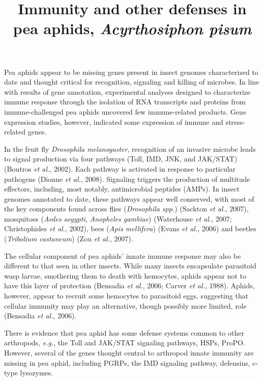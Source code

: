 \documentclass[11pt]{article}
\title{Immunity and other defenses in pea aphids, \textit{Acyrthosiphon pisum}}
\author{}
\date{}
\begin{document}
  \maketitle

  \linenumbers
Pea aphids appear to be missing genes present in insect genomes characterized to date and thought critical for recognition, signaling and killing of microbes. 
In line with results of gene annotation, experimental analyses designed to characterize immune response through the isolation of RNA transcripts and proteins from immune-challenged pea aphids uncovered few immune-related products. 
Gene expression studies, however, indicated some expression of immune and stress-related genes.

\newline

In the fruit fly \textit{Drosophila melanogaster}, recognition of an invasive microbe leads to signal production via four pathways (Toll, IMD, JNK, and JAK/STAT) (Boutros \textit{et al.}, 2002). 
Each pathway is activated in response to particular pathogens (Dionne \textit{et al.}, 2008). 
Signaling triggers the production of multitude effectors, including, most notably, antimicrobial peptides (AMPs). 
In insect genomes annotated to date, these pathways appear well conserved, with most of the key components found across flies (\textit{Drosophila spp.}) (Sackton \textit{et al.}, 2007), mosquitoes (\textit{Aedes aegypti}, \textit{Anopheles gambiae}) (Waterhouse \textit{et al.}, 2007; Christophides \textit{et al.}, 2002), bees (\textit{Apis mellifera}) (Evans \textit{et al.}, 2006) and beetles (\textit{Tribolium castaneum}) (Zou \textit{et al.}, 2007).

\newline

The cellular component of pea aphids’ innate immune response may also be different to that seen in other insects. 
While many insects encapsulate parasitoid wasp larvae, smothering them to death with hemocytes, aphids appear not to have this layer of protection (Bensadia \textit{et al.}, 2006; Carver \textit{et al.}, 1988). 
Aphids, however, appear to recruit some hemocytes to parasitoid eggs, suggesting that cellular immunity may play an alternative, though possibly more limited, role (Bensadia \textit{et al.}, 2006).

\newline

There is evidence that pea aphid has some defense systems common to other arthropods, \textit{e.g.}, the Toll and JAK/STAT signaling pathways, HSPs, ProPO. 
However, several of the genes thought central to arthropod innate immunity are missing in pea aphid, including PGRPs, the IMD signaling pathway, defensins, c-type lysozymes. 
\end{document}
